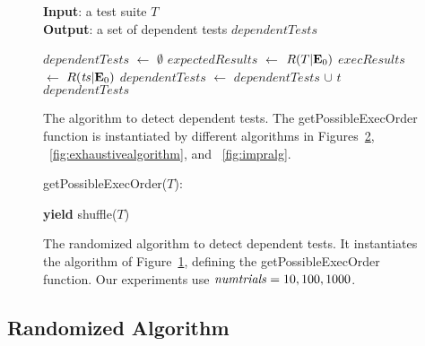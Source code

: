 \begin{figure}[t]
\textbf{Input}: a test suite $\mathit{T}$\\
\textbf{Output}: a set of dependent tests $\mathit{dependentTests}$\\
\vspace{-5mm}
\begin{algorithmic}[1]
\STATE $\mathit{dependentTests}$ $\leftarrow$ $\emptyset$
\STATE $\mathit{expectedResults}$ $\leftarrow$ $R(T|\mathbf{E}_0)$
\STATE $\mathit{execResults}$ $\leftarrow$ $R(\mathit{ts}|\mathbf{E}_0)$
\STATE $\mathit{dependentTests}$ $\leftarrow$ $\mathit{dependentTests}$ $\cup$ $\mathit{t}$
\ENDIF
\ENDFOR
\ENDFOR
\RETURN $\mathit{dependentTests}$
\end{algorithmic}


\vspace{-3mm}
\caption {The algorithm to detect dependent tests.
The getPossibleExecOrder function is instantiated
by different algorithms in Figures~\ref{fig:randalgorithm},
~\ref{fig:exhaustivealgorithm}, and ~\ref{fig:impralg}.
}
\label{fig:basealgorithm}
\end{figure}


\begin{figure}[t]
getPossibleExecOrder($T$):\\
\vspace{-5mm}
\begin{algorithmic}[1]
\STATE \textbf{yield} shuffle($T$)
\ENDFOR
\end{algorithmic}

\vspace{-3mm}
\caption {The randomized algorithm to detect dependent tests.
It instantiates the algorithm of Figure~\ref{fig:basealgorithm}, defining
the getPossibleExecOrder function.
Our experiments use $\mathit{numtrials} = 10,
100, 1000$.}
\label{fig:randalgorithm}
\end{figure}


\subsection{Randomized Algorithm}
\label{sec:randomized}

